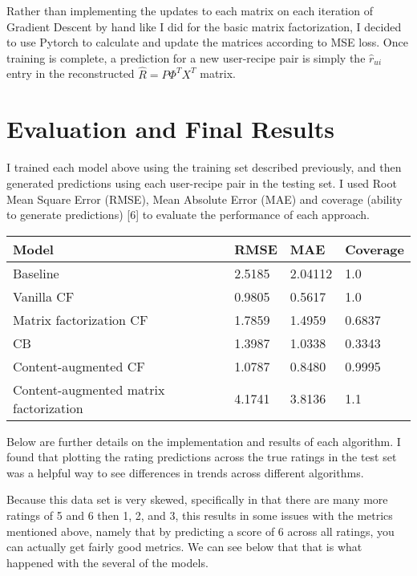 \documentclass{article}
\begin{document}
Rather than implementing the updates to each matrix on each iteration of Gradient Descent by hand like I did for the basic matrix factorization, I decided to use Pytorch to calculate and update the matrices according to MSE loss. Once training is complete, a prediction for a new user-recipe pair is simply the $\hat r_{ui}$ entry in the reconstructed $\hat R = P\Phi^TX^T$ matrix.

\section{Evaluation and Final Results}

I trained each model above using the training set described previously, and then generated predictions using each user-recipe pair in the testing set. I used Root Mean Square Error (RMSE), Mean Absolute Error (MAE) and coverage (ability to generate predictions) [6] to evaluate the performance of each approach. 
\vspace{.1in}

\begin{tabular}{|| p{30mm} | p{15mm} p{15mm} p{15mm}||} 
 \hline
  Model &  RMSE & MAE & Coverage \\ [0.5ex] 
 \hline\hline
 Baseline & 2.5185 & 2.04112 & 1.0 \\
 \hline
 Vanilla CF & 0.9805 & 0.5617 & 1.0 \\
 \hline
 Matrix \newline factorization CF & 1.7859 & 1.4959 &  0.6837\\
 \hline
 CB & 1.3987 & 1.0338 & 0.3343 \\
 \hline
 Content-augmented CF & 1.0787 & 0.8480 & 0.9995 \\
 \hline
 Content-augmented  matrix \newline factorization &  4.1741 &  3.8136 &  1.1\\
 \hline
\end{tabular}

\vspace{.1in}

Below are further details on the implementation and results of each algorithm. I found that plotting the rating predictions across the true ratings in the test set was a helpful way to see differences in trends across different algorithms. 

Because this data set is very skewed, specifically in that there are many more ratings of 5 and 6 then 1, 2, and 3, this results in some issues with the metrics mentioned above, namely that by predicting a score of 6 across all ratings, you can actually get fairly good metrics. We can see below that that is what happened with the several of the models. 
\end{document}
